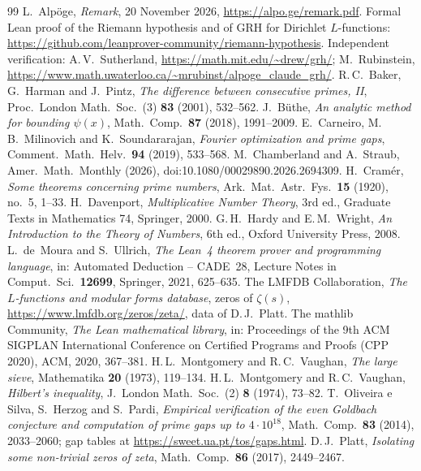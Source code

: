 \documentclass[11pt,colorlinks]{charlie}
\begin{document}
\begin{thebibliography}{99}\small
{} L.~Alp\"oge, \emph{Remark}, 20 November 2026, \url{https://alpo.ge/remark.pdf}. Formal Lean proof of the Riemann hypothesis and of GRH for Dirichlet $L$-functions: \url{https://github.com/leanprover-community/riemann-hypothesis}. Independent verification: A.\,V.~Sutherland, \url{https://math.mit.edu/~drew/grh/}; M.~Rubinstein, \url{https://www.math.uwaterloo.ca/~mrubinst/alpoge_claude_grh/}.
 R.\,C.~Baker, G.~Harman and J.~Pintz, \emph{The difference between consecutive primes, II}, Proc.\ London Math.\ Soc.\ (3) \textbf{83} (2001), 532--562.
 J.~B\"uthe, \emph{An analytic method for bounding $\psi(x)$}, Math.\ Comp.\ \textbf{87} (2018), 1991--2009.
 E.~Carneiro, M.\,B.~Milinovich and K.~Soundararajan, \emph{Fourier optimization and prime gaps}, Comment.\ Math.\ Helv.\ \textbf{94} (2019), 533--568.
 M.~Chamberland and A.~Straub, Amer.\ Math.\ Monthly (2026), doi:10.1080/00029890.2026.2694309.
 H.~Cram\'er, \emph{Some theorems concerning prime numbers}, Ark.\ Mat.\ Astr.\ Fys.\ \textbf{15} (1920), no.~5, 1--33.
 H.~Davenport, \emph{Multiplicative Number Theory}, 3rd ed., Graduate Texts in Mathematics 74, Springer, 2000.
 G.\,H.~Hardy and E.\,M.~Wright, \emph{An Introduction to the Theory of Numbers}, 6th ed., Oxford University Press, 2008.
 L.~de~Moura and S.~Ullrich, \emph{The Lean~4 theorem prover and programming language}, in: Automated Deduction -- CADE~28, Lecture Notes in Comput.\ Sci.\ \textbf{12699}, Springer, 2021, 625--635.
 The LMFDB Collaboration, \emph{The $L$-functions and modular forms database}, zeros of $\zeta(s)$, \url{https://www.lmfdb.org/zeros/zeta/}, data of D.\,J.~Platt.
 The mathlib Community, \emph{The Lean mathematical library}, in: Proceedings of the 9th ACM SIGPLAN International Conference on Certified Programs and Proofs (CPP 2020), ACM, 2020, 367--381.
 H.\,L.~Montgomery and R.\,C.~Vaughan, \emph{The large sieve}, Mathematika \textbf{20} (1973), 119--134.
 H.\,L.~Montgomery and R.\,C.~Vaughan, \emph{Hilbert's inequality}, J.\ London Math.\ Soc.\ (2) \textbf{8} (1974), 73--82.
 T.~Oliveira e Silva, S.~Herzog and S.~Pardi, \emph{Empirical verification of the even Goldbach conjecture and computation of prime gaps up to $4\cdot10^{18}$}, Math.\ Comp.\ \textbf{83} (2014), 2033--2060; gap tables at \url{https://sweet.ua.pt/tos/gaps.html}.
 D.\,J.~Platt, \emph{Isolating some non-trivial zeros of zeta}, Math.\ Comp.\ \textbf{86} (2017), 2449--2467.

\end{thebibliography}
\end{document}
